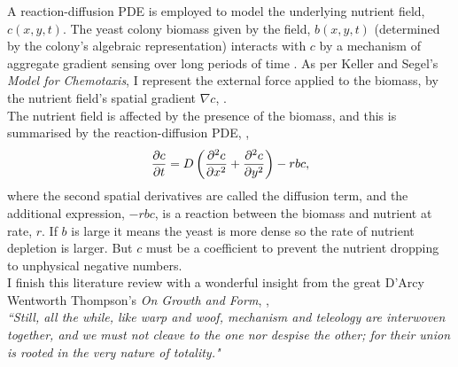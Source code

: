 A reaction-diffusion PDE is employed to model the underlying 
nutrient field, $c(x,y,t)$. The yeast colony biomass given by the field, 
$b(x,y,t)$ (determined by the colony's algebraic representation) interacts 
with $c$ by a mechanism of aggregate 
gradient sensing over long periods of time \cite{keller1971model}. 
As per Keller and Segel's \textit{Model for Chemotaxis},
I represent the external force applied to the biomass, by the nutrient 
field's spatial gradient $\nabla c$, \cite{keller1971model}.
\\

The nutrient field is affected by the presence of the biomass,
and this is summarised by the reaction-diffusion PDE, \cite{fisher1937wave},
\begin{equation*}
    \pdv{c}{t} = D \left( \frac{\partial^2 c}{\partial x^2} + \frac{\partial^2 c}{\partial y^2}\right) - r b c,
\end{equation*}
where the second spatial derivatives are called the diffusion term, 
and the additional expression, $-rbc$, is a reaction between the biomass and nutrient at rate, $r$.
If $b$ is large it means the yeast is more dense so the rate of nutrient depletion 
is larger. But $c$ must be a coefficient to prevent the nutrient dropping to unphysical negative 
numbers.
\\

I finish this literature review with a wonderful insight
from the great D'Arcy Wentworth Thompson's \textit{On Growth and Form}, 
\cite{thompson1992growth},
\\

\textit{
``Still, all the while, like warp and woof, mechanism and teleology
are interwoven together, and we must not cleave to the one nor
despise the other; for their union is rooted in the very nature of
totality."}






